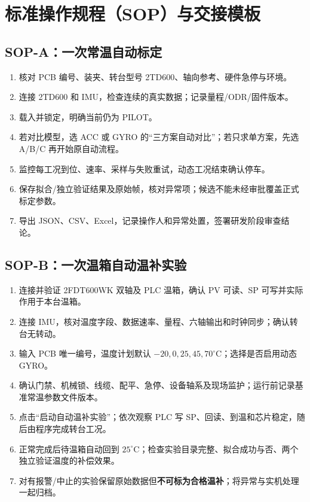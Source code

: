 \chapter{标准操作规程（SOP）与交接模板}
\section{SOP-A：一次常温自动标定}
\begin{enumerate}
\item 核对 PCB 编号、装夹、转台型号 2TD600、轴向参考、硬件急停与环境。
\item 连接 2TD600 和 IMU，检查连续的真实数据；记录量程/ODR/固件版本。
\item 载入并锁定，明确当前仍为 PILOT。
\item 若对比模型，选 ACC 或 GYRO 的“三方案自动对比”；若只求单方案，先选 A/B/C 再开始原自动流程。
\item 监控每工况到位、速率、采样与失败重试，动态工况结束确认停车。
\item 保存拟合/独立验证结果及原始帧，核对异常项；候选不能未经审批覆盖正式标定参数。
\item 导出 JSON、CSV、Excel，记录操作人和异常处置，签署研发阶段审查结论。
\end{enumerate}

\section{SOP-B：一次温箱自动温补实验}
\begin{enumerate}
\item 连接并验证 2FDT600WK 双轴及 PLC 温箱，确认 PV 可读、SP 可写并实际作用于本台温箱。
\item 连接 IMU，核对温度字段、数据速率、量程、六轴输出和时钟同步；确认转台无转动。
\item 输入 PCB 唯一编号，温度计划默认 $-20,0,25,45,70^\circ\mathrm C$；选择是否启用动态 GYRO。
\item 确认门禁、机械锁、线缆、配平、急停、设备轴系及现场监护；运行前记录基准常温参数文件版本。
\item 点击“启动自动温补实验”；依次观察 PLC 写 SP、回读、到温和芯片稳定，随后由程序完成转台工况。
\item 正常完成后待温箱自动回到 $25^\circ\mathrm C$；检查实验目录完整、拟合成功与否、两个独立验证温度的补偿效果。
\item 对有报警/中止的实验保留原始数据但\textbf{不可标为合格温补}；将异常与实机处理一起归档。
\end{enumerate}

